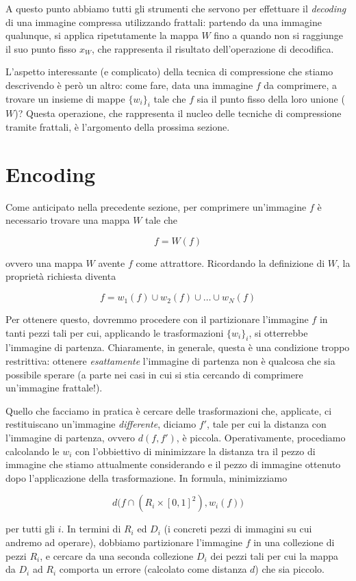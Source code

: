\documentclass[11pt,a4paper,appendixprefix=true,numbers=noenddot]{scrreprt}
\begin{document}
A questo punto abbiamo tutti gli strumenti che servono per effettuare il \emph{decoding} di una immagine compressa utilizzando frattali: partendo  da una immagine qualunque, si applica ripetutamente la mappa $W$ fino a quando non si raggiunge il suo punto fisso $x_W$, che rappresenta il risultato dell'operazione di decodifica.

L'aspetto interessante (e complicato) della tecnica di compressione che stiamo descrivendo è però un altro: come fare, data una immagine $f$ da comprimere, a trovare un insieme di mappe $\{w_i\}_i$ tale che $f$ sia il punto fisso della loro unione ($W$)? Questa operazione, che rappresenta il nucleo delle tecniche di compressione tramite frattali, è l'argomento della prossima sezione.

\section{Encoding}

Come anticipato nella precedente sezione, per comprimere un'immagine $f$ è necessario trovare una mappa $W$ tale che 

\[
f = W(f)
\]

ovvero una mappa $W$ avente $f$ come attrattore. Ricordando la definizione di $W$, la proprietà richiesta diventa

\[
f = w_1(f) \cup w_2(f) \cup \dots \cup w_N(f)
\]

Per ottenere questo, dovremmo procedere con il partizionare l'immagine $f$ in tanti pezzi tali per cui, applicando le trasformazioni $\{w_i\}_i$, si otterrebbe l'immagine di partenza. Chiaramente, in generale, questa è una condizione troppo restrittiva: ottenere \emph{esattamente} l'immagine di partenza non è qualcosa che sia possibile sperare (a parte nei casi in cui si stia cercando di comprimere un'immagine frattale!).

Quello che facciamo in pratica è cercare delle trasformazioni che, applicate, ci restituiscano un'immagine \emph{differente}, diciamo $f'$, tale per cui la distanza con l'immagine di partenza, ovvero $d(f,f')$, è piccola. Operativamente, procediamo calcolando le $w_i$ con l'obbiettivo di minimizzare la distanza tra il pezzo di immagine che stiamo attualmente considerando e il pezzo di immagine ottenuto dopo l'applicazione della trasformazione. In formula, minimizziamo

\[
d\big(f \cap (R_i \times [0,1]^2), w_i(f)\big) 
\]

per tutti gli $i$. In termini di $R_i$ ed $D_i$ (i concreti pezzi di immagini su cui andremo ad operare), dobbiamo partizionare l'immagine $f$ in una collezione di pezzi $R_i$, e cercare da una seconda collezione $D_i$ dei pezzi tali per cui la mappa da $D_i$ ad $R_i$ comporta un errore (calcolato come distanza $d$) che sia piccolo.
\end{document}
